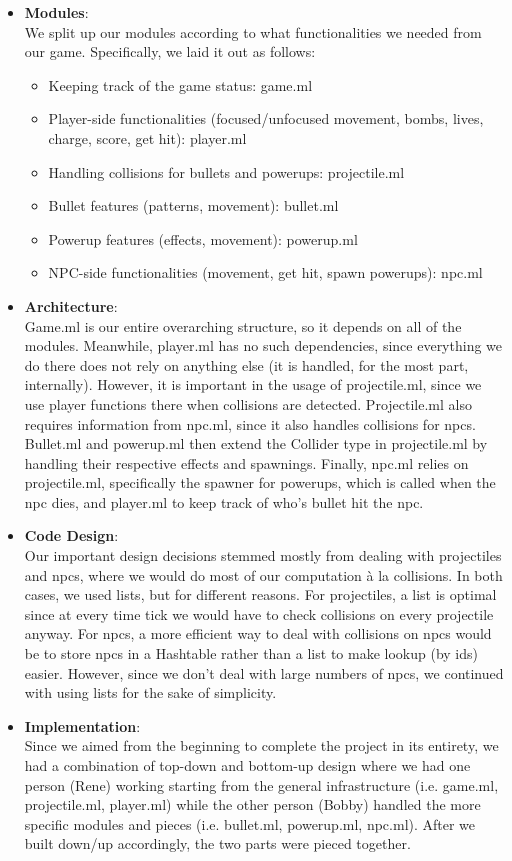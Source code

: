 \documentclass{article}[12pt]
\begin{document}
\begin{itemize}
	\item \large{\textbf{Modules}}: \\
		We split up our modules according to what functionalities we needed from our game. Specifically, we laid it out as follows:
		\begin{itemize}
			\item Keeping track of the game status: game.ml
			\item Player-side functionalities (focused/unfocused movement, bombs, lives, charge, score, get hit): player.ml
			\item Handling collisions for bullets and powerups: projectile.ml
			\item Bullet features (patterns, movement): bullet.ml
			\item Powerup features (effects, movement): powerup.ml
			\item NPC-side functionalities (movement, get hit, spawn powerups): npc.ml
		\end{itemize}
	\item \large{\textbf{Architecture}}: \\ 
		Game.ml is our entire overarching structure, so it depends on all of the modules. Meanwhile, player.ml has no such dependencies, since everything we do there does not rely on anything else (it is handled, for the most part, internally). However, it is important in the usage of projectile.ml, since we use player functions there when collisions are detected. Projectile.ml also requires information from npc.ml, since it also handles collisions for npcs. Bullet.ml and powerup.ml then extend the Collider type in projectile.ml by handling their respective effects and spawnings. Finally, npc.ml relies on projectile.ml, specifically the spawner for powerups, which is called when the npc dies, and player.ml to keep track of who's bullet hit the npc.
	\item \large{\textbf{Code Design}}: \\
		Our important design decisions stemmed mostly from dealing with projectiles and npcs, where we would do most of our computation \`{a} la collisions. In both cases, we used lists, but for different reasons. For projectiles, a list is optimal since at every time tick we would have to check collisions on every projectile anyway. For npcs, a more efficient way to deal with collisions on npcs would be to store npcs in a Hashtable rather than a list to make lookup (by ids) easier. However, since we don't deal with large numbers of npcs, we continued with using lists for the sake of simplicity.
	\item \large{\textbf{Implementation}}: \\
		Since we aimed from the beginning to complete the project in its entirety, we had a combination of top-down and bottom-up design where we had one person (Rene) working starting from the general infrastructure (i.e. game.ml, projectile.ml, player.ml) while the other person (Bobby) handled the more specific modules and pieces (i.e. bullet.ml, powerup.ml, npc.ml). After we built down/up accordingly, the two parts were pieced together.
\end{itemize}
\end{document}
